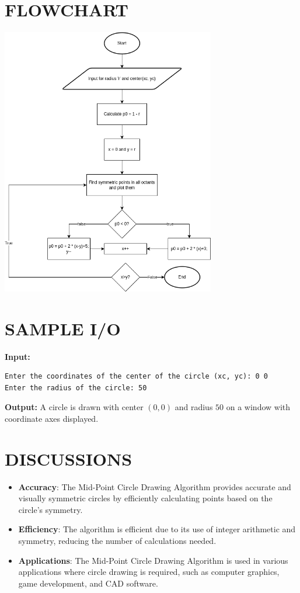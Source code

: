 \documentclass{article}
\begin{document}
\section*{FLOWCHART}
\begin{center}
\includegraphics[width=0.7\textwidth]{flowchart.png}
\end{center}

\section*{SAMPLE I/O}
\textbf{Input:}
\begin{verbatim}
Enter the coordinates of the center of the circle (xc, yc): 0 0
Enter the radius of the circle: 50
\end{verbatim}

\textbf{Output:}
A circle is drawn with center $(0, 0)$ and radius $50$ on a window with coordinate axes displayed.

\section*{DISCUSSIONS}
\begin{itemize}
    \item \textbf{Accuracy}: The Mid-Point Circle Drawing Algorithm provides accurate and visually symmetric circles by efficiently calculating points based on the circle's symmetry.
    \item \textbf{Efficiency}: The algorithm is efficient due to its use of integer arithmetic and symmetry, reducing the number of calculations needed.
    \item \textbf{Applications}: The Mid-Point Circle Drawing Algorithm is used in various applications where circle drawing is required, such as computer graphics, game development, and CAD software.
\end{itemize}
\end{document}

